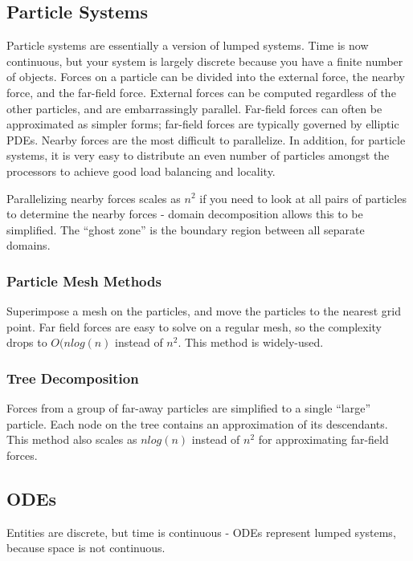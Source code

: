 \documentclass[10pt]{article}
\begin{document}
\begin{flushleft}
\subsection{Particle Systems}

Particle systems are essentially a version of lumped systems. Time is now continuous, but your system is largely discrete because you have a finite number of objects. Forces on a particle can be divided into the external force, the nearby force, and the far-field force. External forces can be computed regardless of the other particles, and are embarrassingly parallel. Far-field forces can often be approximated as simpler forms; far-field forces are typically governed by elliptic PDEs. Nearby forces are the most difficult to parallelize. In addition, for particle systems, it is very easy to distribute an even number of particles amongst the processors to achieve good load balancing and locality.

Parallelizing nearby forces scales as \(n^2\) if you need to look at all pairs of particles to determine the nearby forces - domain decomposition allows this to be simplified. The ``ghost zone'' is the boundary region between all separate domains. 

\subsubsection{Particle Mesh Methods}

Superimpose a mesh on the particles, and move the particles to the nearest grid point. Far field forces are easy to solve on a regular mesh, so the complexity drops to \(O(nlog(n)\) instead of \(n^2\). This method is widely-used.

\subsubsection{Tree Decomposition}

Forces from a group of far-away particles are simplified to a single ``large'' particle. Each node on the tree contains an approximation of its descendants. This method also scales as \(nlog(n)\) instead of \(n^2\) for approximating far-field forces. 

\subsection{ODEs}

Entities are discrete, but time is continuous - ODEs represent lumped systems, because space is not continuous. 


\end{flushleft}
\end{document}
